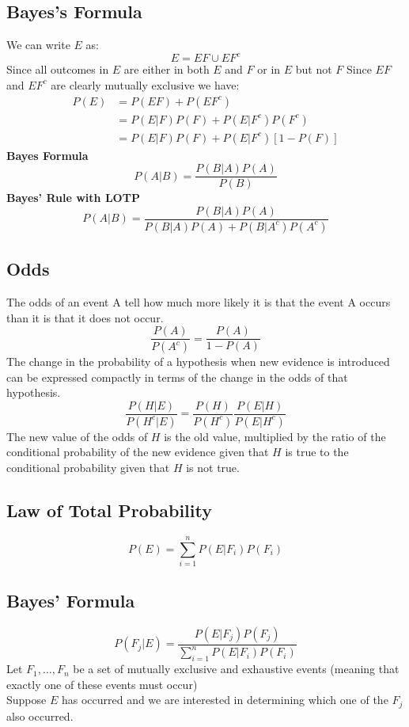 \documentclass[openany]{book}
\numberwithin{equation}{section}
\begin{document}
\begin{flushleft}
\section{Bayes's Formula}
We can write $E$ as:
\[E=EF\cup EF^c
\]
Since all outcomes in $E$ are either in both $E$ and $F$ or in $E$ but not $F$\medbreak
Since $EF$ and $EF^c$ are clearly mutually exclusive we have:
\begin{align}
\label{3}
P(E)&=P(EF)+P(EF^c) \nonumber\\
&=P(E|F)P(F)+ P(E|F^c)P(F^c) \nonumber\\
&=P(E|F)P(F)+P(E|F^c)[1-P(F)] 
\end{align}
\textbf{Bayes Formula}
\[P(A|B)=\frac{P(B|A)P(A)}{P(B)}
\]
\textbf{Bayes' Rule with LOTP}
\begin{equation}
\label{bl}
P(A|B)=\frac{P(B|A)P(A)}{P(B|A)P(A)+P(B|A^c)P(A^c)}
\end{equation}
\subsection{Odds}
The odds of an event A tell how much more likely it is that the event A occurs
than it is that it does not occur.
\[
\frac{P(A)}{P(A^c)}=\frac{P(A)}{1-P(A)}
\]
The change in the probability of a hypothesis when new evidence is introduced can be expressed compactly in terms of the change in the odds of that hypothesis.
\begin{equation}
\label{oddsratio}\frac{P(H|E)}{P(H^c|E)}=\frac{P(H)}{P(H^c)}\frac{P(E|H)}{P(E|H^c)}
\end{equation}
The new value of the odds of $H$ is the old value, multiplied by the ratio of the conditional probability of the new evidence given that $H$ is true to the conditional probability given that $H$ is not true.
\subsection{Law of Total Probability}
\begin{equation}
\label{lotp}
P(E)=\sum_{i=1}^{n}P(E|F_i)P(F_i)
\end{equation}
\subsection{Bayes' Formula}
\begin{equation}
\label{bf}
P(F_j|E)=\frac{P(E|F_j)P(F_j)}{\sum\limits_{i=1}^{n}P(E|F_i)P(F_i)}
\end{equation}
Let $F_1,\dots, F_n$ be a set of mutually exclusive and exhaustive events (meaning that exactly one of these events must occur)\\
Suppose $E$ has occurred and we are interested in determining which one of the $F_j$ also occurred.

\end{flushleft}
\end{document}

